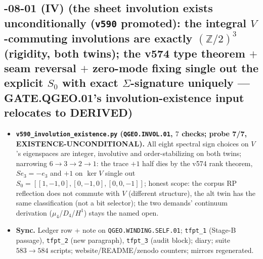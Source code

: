 \subsection*{-08-01 (IV) (the sheet involution exists unconditionally (\texttt{v590} promoted): the integral $V$-commuting involutions are exactly $(\mathbb{Z}/2)^3$ (rigidity, both twins); the v574 type theorem $+$ seam reversal $+$ zero-mode fixing single out the explicit $S_0$ with exact $\Sigma$-signature uniquely --- GATE.QGEO.01's involution-existence input relocates to DERIVED)}
\begin{itemize}[leftmargin=1.5em]
\item \textbf{\texttt{v590\_involution\_existence.py} (\texttt{QGEO.INVOL.01}, $7$ checks;
probe 7/7, EXISTENCE-UNCONDITIONAL).} All eight spectral sign choices on $V$'s eigenspaces
are integer, involutive and order-stabilizing on both twins; narrowing $6\to3\to2\to1$:
the trace $+1$ half dies by the v574 rank theorem, $Se_3=-e_3$ and $+1$ on $\ker V$ single
out $S_0=[[1,-1,0],[0,-1,0],[0,0,-1]]$; honest scope: the corpus RP reflection does not
commute with $V$ (different structure), the alt twin has the same classification (not a bit
selector); the two demands' continuum derivation ($\mu_4$/$D_4$/$H^1$) stays the named open.
\item \textbf{Sync.} Ledger row + note on \texttt{QGEO.WINDING.SELF.01}; \texttt{tfpt\_1}
(Stage-B passage), \texttt{tfpt\_2} (new paragraph), \texttt{tfpt\_3} (audit block); diary;
suite $583\to584$ scripts; website/README/zenodo counters; mirrors regenerated.
\end{itemize}

